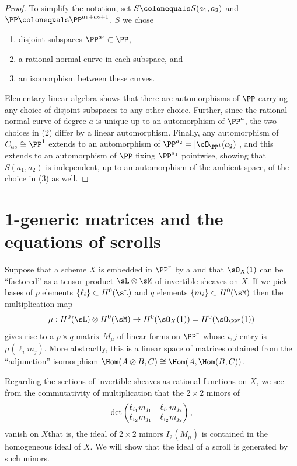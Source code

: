 \begin{proof}
To simplify the notation, set $S \colonequals  S(a_{1}, a_{2})$ and $\PP
\colonequals  \PP^{a_1+a_2+1}$.
$S$ we chose
\begin{enumerate}
\item disjoint subspaces $\PP^{a_i}\subset \PP$,
\item a rational normal curve in each subspace, and
\item an isomorphism between these curves.
\end{enumerate}
Elementary linear algebra shows that there are automorphisms of $\PP$
carrying any choice of disjoint subspaces to any other choice. Further,
since the rational normal curve of degree $a$ is unique up to an
automorphism of $\PP^{a}$, the two choices in (2) differ by a linear
automorphism. Finally, any automorphism of $C_{a_{2}}\cong \PP^{1}$
extends to an automorphism of $\PP^{a_{2}} = |\cO_{\PP^{1}}(a_{2})|$, and
this extends to an automorphism of $\PP$ fixing $\PP^{a_{1}}$ pointwise,
showing that $S(a_{1}, a_{2})$ is independent, up to an automorphism of
the ambient space, of the choice in (3)  as well.
\end{proof}

\section{1-generic matrices and the equations of scrolls}\label{particular
name}

Suppose that a scheme $X $ is embedded in $\PP^r$ by a 
%
%
and that
$\sO_X(1)$ can be ``factored'' as a tensor product $\sL\otimes
\sM$ of invertible sheaves on $X$. If we pick bases of $p$  elements
$\{\ell_i\}\subset H^0(\sL)$ and  $q$  elements $\{m_i\} \subset H^0(\sM)$
then the multiplication map
%
$$
\mu: H^0(\sL) \otimes H^0(\sM) \to H^0(\sO_{X}(1))= H^0(\sO_{\PP^r}(1))
$$
gives rise to
a $p\times q$ matrix $M_\mu$ of linear forms on $\PP^r$ whose $i,j$
entry is $\mu(\ell_im_j)$.
More abstractly, this is a linear space of matrices obtained from the
``adjunction'' isomorphism
$\Hom(A\otimes B, C)\cong \Hom(A, \Hom(B,C))$.

Regarding the sections of invertible sheaves as rational functions on $X$,
we see from the commutativity of
multiplication that the $2\times 2$ minors
of
\vspace*{3pt}
$$
\vspace*{3pt}
\det \begin{pmatrix}
\ell_{i_1}m_{j_1} & \ell_{i_1}m_{j_2}\\
\ell_{i_2}m_{j_1} &\ell_{i_2}m_{j_2}
\end{pmatrix},
$$
vanish on $X$\emdash that is, the ideal of $2\times 2$ minors $I_2(M_\mu)$
is contained in the homogeneous ideal
of $X$. We will show that the ideal of a scroll is
generated by such minors.

